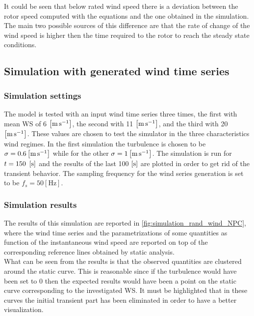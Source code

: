 

It could be seen that below rated wind speed there is a deviation between the rotor speed computed with the equations and the one obtained in the simulation. The main two possible sources of this difference are that the rate of change of the wind speed is higher then the time required to the rotor to reach the steady state conditions. 

\subsection{Simulation with generated wind time series}\label{sec:wind_series_sim}
\subsubsection{Simulation settings}
The model is tested with an input wind time series three times, the first with mean \acrshort{WS} of 6 $\left[\si{\meter\per\second}\right]$, the second with  11 $\left[\si{\meter\per\second}\right]$, and the third with 20 $\left[\si{\meter\per\second}\right]$. These values are chosen to test the simulator in the three characteristics wind regimes. In the first simulation the turbulence is chosen to be $\sigma=0.6 \left[\si{\meter\per\second}\right]$ while for the other $\sigma=1 \left[\si{\meter\per\second}\right]$. The simulation is run for $t=150\ \left[\si{\second}\right]$ and the results of the last 100 $\left[\si{\second}\right]$ are plotted in order to get rid of the transient behavior. The sampling frequency for the wind series generation is set to be $f_s=50 \left[\si{\hertz}\right]$.

\subsubsection{Simulation results}
The results of this simulation are reported in \autoref{fig:simulation_rand_wind_NPC}, where the wind time series and the parametrizations of some quantities as function of the instantaneous wind speed are reported on top of the corresponding reference lines obtained by static analysis. \\
What can be seen from the results is that the observed quantities are clustered around the static curve. This is reasonable since if the turbulence would have been set to 0 then the expected results would have been a point on the static curve corresponding to the investigated WS. It must be highlighted that in these curves the initial transient part has been eliminated in order to have a better visualization. 

